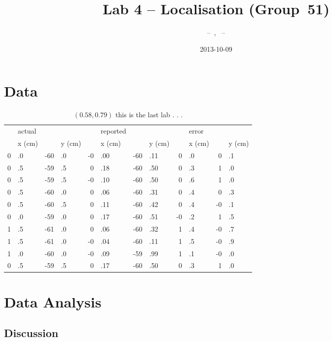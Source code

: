 \documentclass[twocolumn]{article}
\author{\bname~--~\bid, \name~--~\id}
\title{Lab 4 -- Localisation (Group~51)}
\date{2013-10-09}
\def\fig#1#2{\begin{figure}[!ht]\begin{center}
\texttt{[image: \#1.jpg]}
\end{center}\caption{#2}\label{#1}\end{figure}}
\begin{document}
\maketitle



\section{Data}

\cite{alexneil3}


\begin{table*}[htb]
\begin{center}\begin{tabular}{r@{}l r@{}l r@{}l r@{}l r@{}l r@{}l}
&actual&&& &reported&&& &error&& \\
&x (cm)& &y (cm)& &x (cm)& &y (cm)& &x (cm)& &y (cm) \\
\hline
0&.0& -60&.0& -0&.00& -60&.11& 0&.0& 0&.1 \\
0&.5& -59&.5& 0&.18& -60&.50& 0&.3& 1&.0 \\
0&.5& -59&.5& -0&.10& -60&.50& 0&.6& 1&.0 \\
0&.5& -60&.0& 0&.06& -60&.31& 0&.4& 0&.3 \\
0&.5& -60&.5& 0&.11& -60&.42& 0&.4& -0&.1 \\
0&.0& -59&.0& 0&.17& -60&.51& -0&.2& 1&.5 \\
1&.5& -61&.0& 0&.06& -60&.32& 1&.4& -0&.7 \\
1&.5& -61&.0& -0&.04& -60&.11& 1&.5& -0&.9 \\
1&.0& -60&.0& -0&.09& -59&.99& 1&.1& -0&.0 \\
0&.5& -59&.5& 0&.17& -60&.50& 0&.3& 1&.0 \\
\end{tabular}\end{center}
\caption{$(0.58, 0.79)$ this is the last lab . . .}
\label{a}
\end{table*}

\section{Data Analysis}

\subsection{Discussion}
\end{document}
